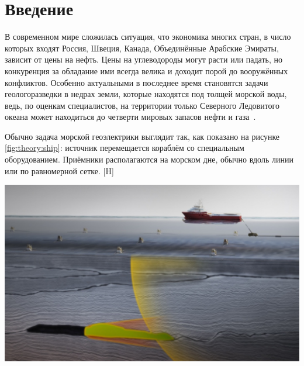 \documentclass[a4paper,14pt]{article}
\makeatletter
\renewenvironment{figure}[1][\fps@figure]{
  \edef\@tempa{\noexpand\@float{figure}[#1]}
  \@tempa
  \addtocounter{foofigure}{1}
}{
  \end@float
}
\makeatother
\begin{document}

\clearpage
\tableofcontents


\clearpage
{}
\section*{Введение}

В современном мире сложилась ситуация, что экономика многих стран, в число которых входят Россия, Швеция, Канада, Объединённые Арабские Эмираты, зависит от цены на нефть. Цены на углеводороды могут расти или падать, но конкуренция за обладание ими всегда велика и доходит порой до вооружённых конфликтов. Особенно актуальными в последнее время становятся задачи геологоразведки в недрах земли, которые находятся под толщей морской воды, ведь, по оценкам специалистов, на территории только Северного Ледовитого океана может находиться до четверти мировых запасов нефти и газа~\citep{shurina}.

Обычно задача морской геоэлектрики выглядит так, как показано на рисунке \ref{fig:theory:ship}: источник перемещается кораблём со специальным оборудованием. Приёмники располагаются на морском дне, обычно вдоль линии или по равномерной сетке.
\begin{figure}[H]
	\centering
	\includegraphics[scale=0.3]{theory/10000000000004B4000002D101BC1A4D.png}
	\caption{задача морской геоэлектрики}
	\label{fig:theory:ship}
\end{figure}

\end{document}
